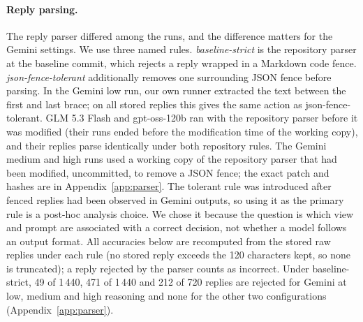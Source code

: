 \paragraph{Reply parsing.} The reply parser differed among the runs, and the difference matters for the Gemini settings. We use three named rules. \emph{baseline-strict} is the repository parser at the baseline commit, which rejects a reply wrapped in a Markdown code fence. \emph{json-fence-tolerant} additionally removes one surrounding JSON fence before parsing. In the Gemini low run, our own runner extracted the text between the first and last brace; on all stored replies this gives the same action as json-fence-tolerant. GLM 5.3 Flash and gpt-oss-120b ran with the repository parser before it was modified (their runs ended before the modification time of the working copy), and their replies parse identically under both repository rules. The Gemini medium and high runs used a working copy of the repository parser that had been modified, uncommitted, to remove a JSON fence; the exact patch and hashes are in Appendix~\ref{app:parser}. The tolerant rule was introduced after fenced replies had been observed in Gemini outputs, so using it as the primary rule is a post-hoc analysis choice. We chose it because the question is which view and prompt are associated with a correct decision, not whether a model follows an output format. All accuracies below are recomputed from the stored raw replies under each rule (no stored reply exceeds the 120 characters kept, so none is truncated); a reply rejected by the parser counts as incorrect. Under baseline-strict, 49 of 1\,440, 471 of 1\,440 and 212 of 720 replies are rejected for Gemini at low, medium and high reasoning and none for the other two configurations (Appendix~\ref{app:parser}).

